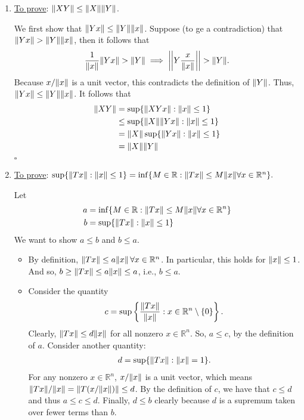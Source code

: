 \documentclass{article}
\begin{document}
\begin{enumerate}
	\item \underline{To prove}: $\norm{X Y} \leq \norm{X}\norm{Y}$. 

	We first show that $\norm{Yx} \leq \norm{Y} \norm{x}$. Suppose (to ge a contradiction) that $\norm{Yx} > \norm{Y} \norm{x}$, then it follows that
	\begin{align*}
	\frac{1}{\norm{x}} \norm{Y x } > \norm{ Y } \implies \bigg\vert\bigg\vert Y \frac{x}{\norm{x}} \bigg\vert\bigg\vert  > \norm{ Y }.
	\end{align*}
	Because $x/\norm{x}$ is a unit vector, this contradicts the definition of $\norm{Y }$. Thus, $\norm{ Yx} \leq \norm{ Y } \norm{ x}$. It follows that
	\begin{align*}
	\norm{ XY } &= \sup  \{ \norm{ XY x } :\norm{x} \leq 1\}\nonumber\\
	&\leq \sup  \{ \norm{ X } \norm{ Y x } :\norm{x} \leq 1\}\nonumber\\
	&= \norm{ X } \sup  \{ \norm{ Y x } : \norm{x} \leq 1\}\nonumber\\
	&= \norm{ X } \norm{ Y } 
	\end{align*}
	\hfill $\square$
	
	
	
	
	
	\item  \underline{To prove}: $\sup  \{ \norm{ T x } :\norm{x} \leq 1\} = \inf  \{ M \in \mathbb{R} : \norm{ Tx } \leq M \norm{ x  } \forall x \in \mathbb{R}^n \}.$
	
	
	Let 
	\begin{align*}
	a &=  \inf  \{ M \in \mathbb{R} : \norm{ Tx } \leq M \norm{ x  } \forall x \in \mathbb{R}^n \}\nonumber\\
	b &=  \sup  \{ \norm{ T x } : \norm{x} \leq 1\}
	\end{align*}
	We want to show $a\leq b$ and $b \leq a$.
	\begin{itemize}
		\item By definition, $\norm{ Tx } \leq a \norm{x}\, \forall x \in \mathbb{R}^n$. In particular, this holds for $\norm{x} \leq 1$. And so, $b \geq \norm{ T x } \leq a \norm{x} \leq a $, i.e.,  $b \leq a$.  
		\item Consider the quantity
		\begin{align*}
		c = \sup \left\{\frac{\norm{ Tx }}{ \norm{x}}: x \in \mathbb{R}^n \setminus\{ 0\} \right\}.
		\end{align*} 
		Clearly, $\norm{ T x } \leq d\norm{x}$ for all nonzero $x \in \mathbb{R}^n$. So, $a \leq c$, by the definition of $a$. Consider another quantity:
		\begin{align*}
		d = \sup \{\norm{Tx}:\norm{x} = 1\}.
		\end{align*}
		For any nonzero $x\in \mathbb{R}^n$, $x/\norm{x}$ is a unit vector, which means $\norm{Tx}/\norm{x} = \norm{T(x/\norm{x})}  \leq d$. By the definition of $c$, we have that $c \leq d$ and thus $a \leq c \leq d$. Finally, $d \leq b$ clearly because $d$ is a supremum taken over fewer terms than $b$. 
		

\end{itemize}
\end{enumerate}
\end{document}
